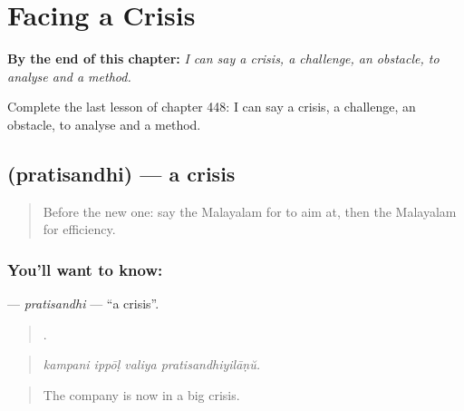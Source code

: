 
\chapter{Facing a Crisis}
\label{ch:ml-facing-a-crisis}

\begin{chapteropening}
\textbf{By the end of this chapter:} \emph{I can say a crisis, a challenge, an obstacle, to analyse and a method.}

Complete the last lesson of chapter 448: I can say a crisis, a challenge, an obstacle, to analyse and a method.
\end{chapteropening}

\section[\texorpdfstring{\ml{പ്രതിസന്ധി} (pratisandhi)}{പ്രതിസന്ധി (pratisandhi)}]{ (pratisandhi) — a crisis}

\label{lesson:ML-C448-pratisandhi}



\begin{quote}
Before the new one: say the Malayalam for to aim at, then the Malayalam for efficiency.
\end{quote}

\subsection*{You'll want to know: }
\textbf{} — \emph{pratisandhi} — \textquotedblleft{}a crisis\textquotedblright{}.

\begin{quote}
   .
\end{quote}

\begin{quote}
\emph{kampani ippōḷ valiya pratisandhiyilāṇŭ.}
\end{quote}

\begin{quote}
The company is now in a big crisis.
\end{quote}

